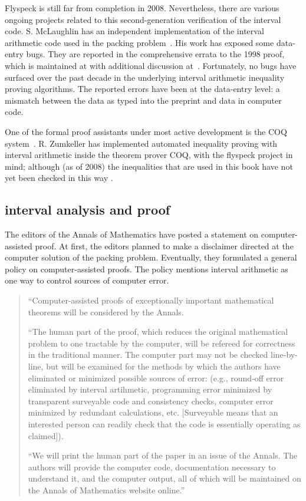 Flyspeck is still far from completion in 2008.  Nevertheless, 
there are various ongoing
projects
related to this second-generation verification of the interval code.
S. McLaughlin has an independent implementation of the interval arithmetic
code used in the packing problem~\cite{McL08}.  
His work has exposed some data-entry bugs.  They are reported
in the comprehensive errata to the 1998 proof, 
which is maintained at \cite{errata} with additional discussion at~\cite{flydis}.  
Fortunately, no bugs have surfaced
over the past decade 
in the underlying interval arithmetic inequality proving algorithms.  The
reported errors have been at the data-entry level:  a mismatch between 
the data as typed
into the preprint and data in computer code.

One of the formal proof assistants under most active development
is the COQ system~\cite{COQ}.  R. Zumkeller
has implemented automated inequality proving with interval arithmetic
inside the theorem prover COQ, with the flyspeck project in
mind; although (as of 2008) the inequalities
that are used in this book have not yet been checked in this way \cite{Zu}.


\subsection{interval analysis and proof}


The editors of the Annals of Mathematics have posted a statement on computer-assisted proof.
At first, the editors planned to make a disclaimer directed at the
computer solution of the packing problem.  Eventually,  they formulated a general policy
on computer-assisted proofs.  The policy mentions interval arithmetic as one way to
control sources of computer error.


\begin{quote}

``Computer-assisted proofs of exceptionally important mathematical theorems will be considered by the Annals.

``The human part of the proof, which reduces the original mathematical problem to one tractable by the computer, will be refereed for correctness in the traditional manner. The computer part may not be checked line-by-line, but will be examined for the methods by which the authors have eliminated or minimized possible sources of error: (e.g., round-off error eliminated by interval artihmetic, programming error minimized by transparent surveyable code and consistency checks, computer error minimized by redundant calculations, etc. [Surveyable means that an interested person can readily check that the code is essentially operating as claimed]).

``We will print the human part of the paper in an issue of the Annals. The authors will provide the computer code, documentation necessary to understand it, and the computer output, all of which will be maintained on the Annals of Mathematics website online.'' \cite{Ann06}

\end{quote}

